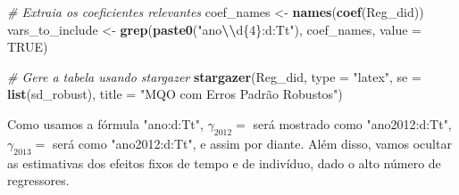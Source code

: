 \documentclass[portugues]{article}
\newenvironment{Shaded}{\begin{snugshade}}{\end{snugshade}}
\newcommand{\AttributeTok}[1]{\textcolor[rgb]{0.13,0.29,0.53}{#1}}
\newcommand{\CommentTok}[1]{\textcolor[rgb]{0.56,0.35,0.01}{\textit{#1}}}
\newcommand{\ConstantTok}[1]{\textcolor[rgb]{0.56,0.35,0.01}{#1}}
\newcommand{\FunctionTok}[1]{\textcolor[rgb]{0.13,0.29,0.53}{\textbf{#1}}}
\newcommand{\NormalTok}[1]{#1}
\newcommand{\OtherTok}[1]{\textcolor[rgb]{0.56,0.35,0.01}{#1}}
\newcommand{\SpecialCharTok}[1]{\textcolor[rgb]{0.81,0.36,0.00}{\textbf{#1}}}
\newcommand{\StringTok}[1]{\textcolor[rgb]{0.31,0.60,0.02}{#1}}
\begin{document}
\begin{boxA}
\begin{Shaded}
\begin{Highlighting}[]
    \CommentTok{\# Extraia os coeficientes relevantes}
    \NormalTok{coef\_names }\OtherTok{\textless{}{-}} \FunctionTok{names}\NormalTok{(}\FunctionTok{coef}\NormalTok{(Reg\_did))}
    \NormalTok{vars\_to\_include }\OtherTok{\textless{}{-}} \FunctionTok{grep}\NormalTok{(}\FunctionTok{paste0}\NormalTok{(}\StringTok{"ano}\SpecialCharTok{\textbackslash{}\textbackslash{}}\StringTok{d\{4\}:d:Tt"}\NormalTok{)},
                            \NormalTok{coef\_names, }\AttributeTok{value =} \ConstantTok{TRUE}\NormalTok{)}
    

    \CommentTok{\# Gere a tabela usando stargazer}
    \FunctionTok{stargazer}\NormalTok{(Reg\_did, }\AttributeTok{type =} \StringTok{"latex"}\NormalTok{, }\AttributeTok{se =} \FunctionTok{list}\NormalTok{(sd\_robust), }
              \AttributeTok{title =} \StringTok{"MQO com Erros Padrão Robustos"}\NormalTok{)}
    \end{Highlighting}
    \end{Shaded}

    Como usamos a fórmula "ano:d:Tt", $\gamma_{2012} = $ será mostrado como "ano2012:d:Tt", $\gamma_{2013} = $ será como "ano2012:d:Tt", e assim por diante. Além disso, vamos ocultar as estimativas dos efeitos fixos de tempo e de indivíduo, dado o alto número de regressores.


\end{boxA}
\end{document}
